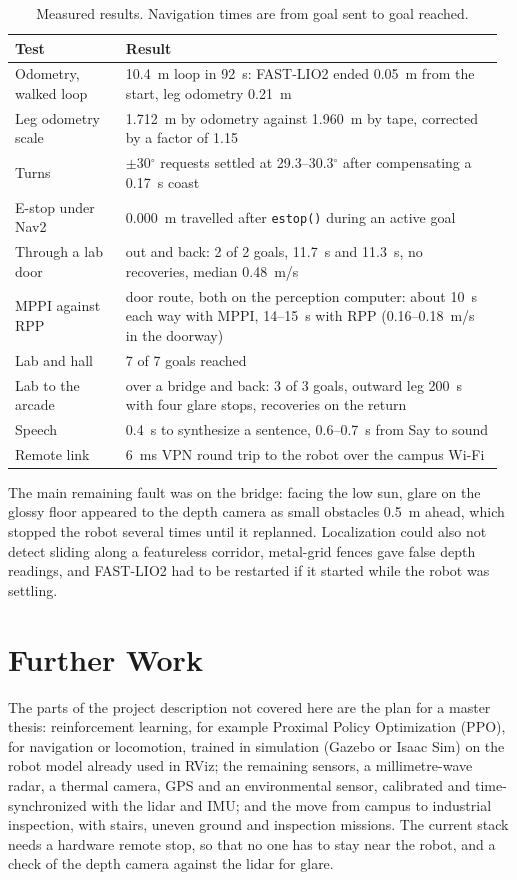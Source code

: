 \documentclass[11pt,a4paper]{article}
\begin{document}
\begin{table}[!t]
\centering\footnotesize
\caption{Measured results. Navigation times are from goal sent to goal reached.}
\label{tab:results}
\begin{tabular}{@{}p{0.22\linewidth}p{0.75\linewidth}@{}}
\toprule
Test & Result \\
\midrule
Odometry, walked loop & 10.4~m loop in 92~s: FAST-LIO2 ended 0.05~m from the start, leg odometry 0.21~m \\
Leg odometry scale & 1.712~m by odometry against 1.960~m by tape, corrected by a factor of 1.15 \\
Turns & $\pm$30$^\circ$ requests settled at 29.3--30.3$^\circ$ after compensating a 0.17~s coast \\
E-stop under Nav2 & 0.000~m travelled after \texttt{estop()} during an active goal \\
Through a lab door & out and back: 2 of 2 goals, 11.7~s and 11.3~s, no recoveries, median 0.48~m/s \\
MPPI against RPP & door route, both on the perception computer: about 10~s each way with MPPI, 14--15~s
  with RPP (0.16--0.18~m/s in the doorway) \\
Lab and hall & 7 of 7 goals reached \\
Lab to the arcade & over a bridge and back: 3 of 3 goals, outward leg 200~s with four glare stops, recoveries on the return \\
Speech & 0.4~s to synthesize a sentence, 0.6--0.7~s from Say to sound \\
Remote link & 6~ms VPN round trip to the robot over the campus Wi-Fi \\
\bottomrule
\end{tabular}
\end{table}

The main remaining fault was on the bridge: facing the low sun, glare on the glossy floor appeared to the
depth camera as small obstacles 0.5~m ahead, which stopped the robot several times until it replanned.
Localization could also not detect sliding along a featureless corridor, metal-grid fences gave false
depth readings, and FAST-LIO2 had to be restarted if it started while the robot was settling.

\section{Further Work}
\label{sec:further}

The parts of the project description not covered here are the plan for a master thesis: reinforcement
learning, for example Proximal Policy Optimization (PPO), for navigation or locomotion, trained in
simulation (Gazebo or Isaac Sim) on the robot model already used in RViz; the remaining sensors, a
millimetre-wave radar, a thermal camera, GPS and an environmental sensor, calibrated and time-synchronized
with the lidar and IMU; and the move from campus to industrial inspection, with stairs, uneven ground and
inspection missions. The current stack needs a hardware remote stop, so that no one has to stay near the robot, and a check
of the depth camera against the lidar for glare.
\end{document}
